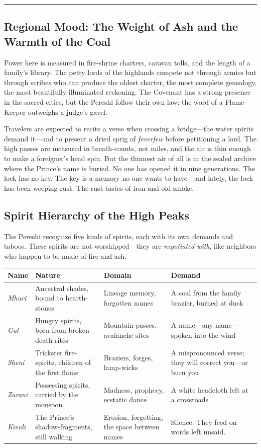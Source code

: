 \vspace{1cm}
\hrule
\vspace{0.5cm}

\subsection*{Regional Mood: The Weight of Ash and the Warmth of the Coal}

Power here is measured in fire-shrine charters, caravan tolls, and the length of a family's library. The petty lords of the highlands compete not through armies but through scribes who can produce the oldest charter, the most complete genealogy, the most beautifully illuminated reckoning. The Covenant has a strong presence in the sacred cities, but the Pereshi follow their own law: the word of a Flame-Keeper outweighs a judge's gavel.

Travelers are expected to recite a verse when crossing a bridge---the water spirits demand it---and to present a dried sprig of \textit{feverfew} before petitioning a lord. The high passes are measured in breath-counts, not miles, and the air is thin enough to make a foreigner's head spin. But the thinnest air of all is in the sealed archive where the Prince's name is buried. No one has opened it in nine generations. The lock has no key. The key is a memory no one wants to have---and lately, the lock has been weeping rust. The rust tastes of iron and old smoke.

\subsection*{Spirit Hierarchy of the High Peaks}
\label{subsec:pereshi-spirits}

The Pereshi recognize five kinds of spirits, each with its own demands and taboos. These spirits are not worshipped---they are \textit{negotiated with}, like neighbors who happen to be made of fire and ash.

\begin{longtable}{|p{}|p{}|p{}|p{}|}
\hline
\textbf{Name} & \textbf{Nature} & \textbf{Domain} & \textbf{Demand} \\
\hline
\textit{Mhuri} & Ancestral shades, bound to hearth-stones & Lineage memory, forgotten names & A coal from the family brazier, burned at dusk \\
\hline
\textit{Gul} & Hungry spirits, born from broken death-rites & Mountain passes, avalanche sites & A name---any name---spoken into the wind \\
\hline
\textit{Sheni} & Trickster fire-spirits, children of the first flame & Braziers, forges, lamp-wicks & A mispronounced verse; they will correct you---or burn you \\
\hline
\textit{Zarani} & Possessing spirits, carried by the monsoon & Madness, prophecy, ecstatic dance & A white headcloth left at a crossroads \\
\hline
\textit{Kivuli} & The Prince's shadow-fragments, still walking & Erosion, forgetting, the space between names & Silence. They feed on words left unsaid. \\
\hline
\end{longtable}

